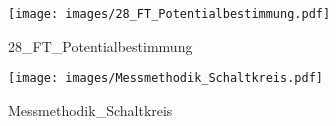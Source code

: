 %
%
\begin{figure}[!hb]%
    \centering
  \texttt{[image: images/28\_FT\_Potentialbestimmung.pdf]}%
  \caption{28_FT_Potentialbestimmung}%
\end{figure}

%
%
\begin{figure}[!hb]%
    \centering
  \texttt{[image: images/Messmethodik\_Schaltkreis.pdf]}%
  \caption{Messmethodik_Schaltkreis}%
\end{figure}

